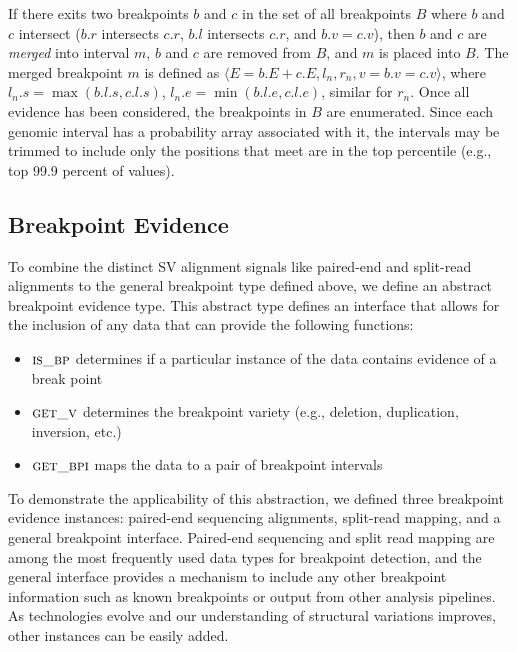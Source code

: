 \documentclass[11pt]{article}
\begin{document}
If there exits two breakpoints $b$ and $c$ in the set of all breakpoints $B$
where $b$ and $c$  intersect ($b.r$ intersects $c.r$, $b.l$ intersects $c.r$,
and $b.v = c.v$), then $b$ and $c$ are {\em merged} into interval $m$, $b$ and
$c$ are removed from $B$, and $m$ is placed into $B$.  The merged breakpoint $m$ 
is defined as $\langle E = b.E + c.E, l_n, r_n, v = b.v = c.v\rangle$, where 
$l_n.s = \max(b.l.s, c.l.s)$, $l_n.e = \min(b.l.e, c.l.e)$, similar for $r_n$.
Once all evidence has been considered, the breakpoints in $B$ are enumerated.
Since each genomic interval has a probability array associated with it, the
intervals may be trimmed to include only the positions that meet are in the top
percentile (e.g., top 99.9 percent of values).

\subsection{Breakpoint Evidence}

To combine the distinct SV alignment signals like paired-end and split-read 
alignments to the general breakpoint type defined above, we define an
abstract breakpoint evidence type.  This abstract type defines an interface that
allows for the inclusion of any data that can provide the following functions:

\begin{itemize}
	\item $\textsc{is\_bp}$ determines if a particular
	instance of the data contains evidence of a break point
	\item $\textsc{get\_v}$ determines the breakpoint 
	variety (e.g., deletion, duplication, inversion, etc.)
	\item $\textsc{get\_bpi}$ maps the data to a pair of
	breakpoint intervals
\end{itemize}

To demonstrate the applicability of this abstraction, we defined three
breakpoint evidence instances: paired-end sequencing alignments, split-read
mapping, and a general breakpoint interface.  Paired-end sequencing and split
read mapping are among the most frequently used data types for breakpoint
detection, and the general interface provides a mechanism to include any other
breakpoint information such as known breakpoints or output from other analysis
pipelines.  As technologies evolve and our understanding of structural
variations improves, other instances can be easily added.
\end{document}
